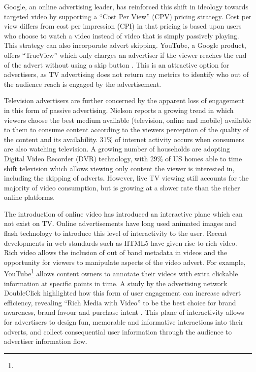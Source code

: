 	Google, an online advertising leader, has reinforced this shift in ideology towards targeted video by supporting a ``Cost Per View'' (CPV) pricing strategy. Cost per view differs from cost per impression (CPI) in that pricing is based upon users who choose to watch a video instead of video that is simply passively playing. This strategy can also incorporate advert skipping. YouTube, a Google product, offers ``TrueView'' which only charges an advertiser if the viewer reaches the end of the advert without using a skip button \citep{trueview}. This is an attractive option for advertisers, as TV advertising does not return any metrics to identify who out of the audience reach is engaged by the advertisement.

	Television advertisers are further concerned by the apparent loss of engagement in this form of passive advertising. Nielson reports a growing trend in which viewers choose the best medium available (television, online and mobile) available to them to consume content according to the viewers perception of the quality of the content and its availability. 31\% of internet activity occurs when consumers are also watching television. A growing number of households are adopting Digital Video Recorder (DVR) technology, with 29\% of US homes able to time shift television which allows viewing only content the viewer is interested in, including the skipping of adverts. However, live TV viewing still accounts for the majority of video consumption, but is growing at a slower rate than the richer online platforms. \citep{three-screen}

	The introduction of online video has introduced an interactive plane which can not exist on TV. Online advertisements have long used animated images and flash technology to introduce this level of interactivity to the user. Recent developments in web standards such as HTML5 have given rise to rich video. Rich video allows the inclusion of out of band metadata in videos and the opportunity for viewers to manipulate aspects of the video advert. For example, YouTube\footnote{} allows content owners to annotate their videos with extra clickable information at specific points in time. A study by the advertising network DoubleClick highlighted how this form of user engagement can increase advert efficiency, revealing ``Rich Media with Video'' to be the best choice for brand awareness, brand favour and purchase intent \citep{rich-video}. This plane of interactivity allows for advertisers to design fun, memorable and informative interactions into their adverts, and collect consequential user information through the audience to advertiser information flow.

